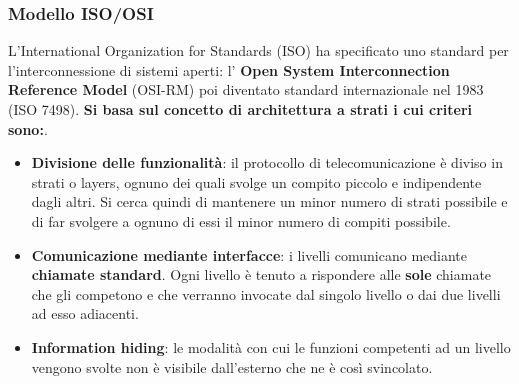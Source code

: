 \documentclass[11pt,a4paper]{article}
\theoremstyle{definition}
\begin{document}
\subsubsection{Modello ISO/OSI}
L’International Organization for Standards (ISO) ha specificato
uno standard per l’interconnessione di sistemi aperti: l' \textbf{Open System Interconnection Reference Model} (OSI-RM) poi diventato standard internazionale nel 1983 (ISO 7498). \textbf{Si basa sul concetto di architettura a strati i cui criteri sono:}.
\begin{itemize}
	\item \textbf{Divisione delle funzionalità}: il protocollo di telecomunicazione è diviso in strati o layers, ognuno dei quali svolge un compito piccolo e indipendente dagli altri.\newline
	      Si cerca quindi di mantenere un minor numero di strati possibile e di far svolgere a ognuno di essi il minor numero di compiti possibile.
	\item \textbf{Comunicazione mediante interfacce}: i livelli comunicano mediante \textbf{chiamate standard}. Ogni livello è tenuto a rispondere alle \textbf{sole} chiamate che gli competono e che verranno
	      invocate dal singolo livello o dai due livelli ad esso adiacenti.
	\item \textbf{Information hiding}: le modalità con cui le funzioni competenti ad un livello
	      vengono svolte non è visibile dall'esterno che ne è così
	      svincolato.
\end{itemize}
\end{document}
